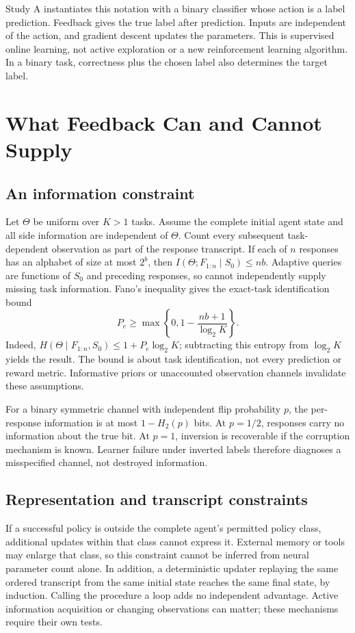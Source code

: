 \documentclass[11pt]{article}
\begin{document}
Study A instantiates this notation with a binary classifier whose action is a
label prediction. Feedback gives the true label after prediction. Inputs are
independent of the action, and gradient descent updates the parameters. This
is supervised online learning, not active exploration or a new reinforcement
learning algorithm. In a binary task, correctness plus the chosen label also
determines the target label.

\section{What Feedback Can and Cannot Supply}
\subsection{An information constraint}
Let $\Theta$ be uniform over $K>1$ tasks. Assume the complete initial agent
state and all side information are independent of $\Theta$. Count every
subsequent task-dependent observation as part of the response transcript.
If each of $n$ responses has an alphabet of size at most $2^b$, then
$I(\Theta;F_{1:n}\mid S_0)\leq nb$. Adaptive queries are functions of
$S_0$ and preceding responses, so cannot independently supply missing task
information. Fano's inequality gives the exact-task identification bound
\[
 P_e\geq \max\left\{0,1-\frac{nb+1}{\log_2 K}\right\}.
\]
Indeed, $H(\Theta\mid F_{1:n},S_0)\leq 1+P_e\log_2 K$; subtracting
this entropy from $\log_2 K$ yields the result. The bound is about task
identification, not every prediction or reward metric. Informative priors or
unaccounted observation channels invalidate these assumptions.

For a binary symmetric channel with independent flip probability $p$, the
per-response information is at most $1-H_2(p)$ bits. At $p=1/2$, responses
carry no information about the true bit. At $p=1$, inversion is recoverable
if the corruption mechanism is known. Learner failure under inverted labels
therefore diagnoses a misspecified channel, not destroyed information.

\subsection{Representation and transcript constraints}
If a successful policy is outside the complete agent's permitted policy class,
additional updates within that class cannot express it. External memory or
tools may enlarge that class, so this constraint cannot be inferred from
neural parameter count alone. In addition, a deterministic updater replaying
the same ordered transcript from the same initial state reaches the same
final state, by induction. Calling the procedure a loop adds no independent
advantage. Active information acquisition or changing observations can matter;
these mechanisms require their own tests.
\end{document}
